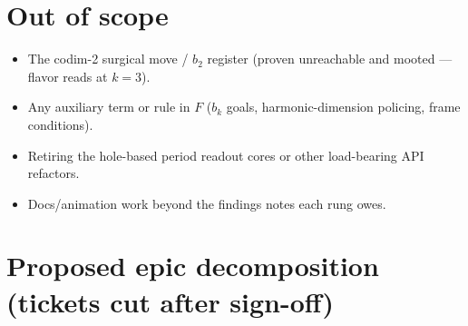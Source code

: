 \documentclass[11pt]{article}
\begin{document}
\section{Out of scope}

\begin{itemize}[leftmargin=2em]
  \item The codim-2 surgical move / $b_2$ register (proven unreachable and mooted ---
        flavor reads at $k = 3$).
  \item Any auxiliary term or rule in $F$ ($b_k$ goals, harmonic-dimension policing,
        frame conditions).
  \item Retiring the hole-based period readout cores or other load-bearing API
        refactors.
  \item Docs/animation work beyond the findings notes each rung owes.
\end{itemize}

\section{Proposed epic decomposition (tickets cut after sign-off)}
\label{sec:tickets}
\end{document}
